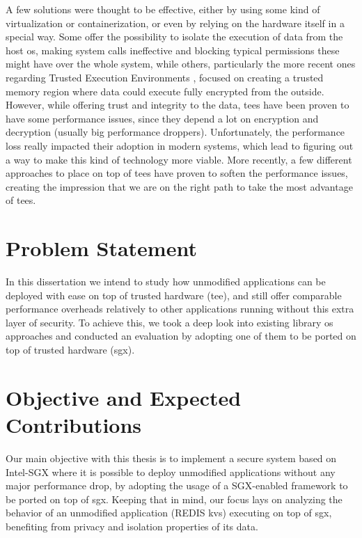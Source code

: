 A few solutions were thought to be effective, either by using some kind of virtualization or containerization, or even by relying on the hardware itself in a special way. 
Some \cite{virtGhostPaper}\cite{flickerPaper}\cite{mushiPaper}\cite{SeCagePaper}\cite{inkTagPaper}\cite{segoPaper} offer the possibility to isolate the execution of data from the host \gls{os}, making system calls ineffective and blocking typical permissions these might have over the whole system, while others, particularly the more recent ones regarding Trusted Execution Environments \cite{armTZPaper}\cite{amdPaper}\cite{sanctumPaper}\cite{intelSGX}, focused on creating a trusted memory region where data could execute fully encrypted from the outside. 
However, while offering trust and integrity to the data, \gls{tee}s have been proven to have some performance issues, since they depend a lot on encryption and decryption (usually big performance droppers). Unfortunately, the performance loss really impacted their adoption in modern systems, which lead to figuring out a way to make this kind of technology more viable. 
More recently, a few different approaches to place on top of \gls{tee}s have proven to soften the performance issues, creating the impression that we are on the right path to take the most advantage of \gls{tee}s. 


\section{Problem Statement}

In this dissertation we intend to study how unmodified applications can be deployed with ease on top of trusted hardware (\gls{tee}), and still offer comparable performance overheads relatively to other applications running without this extra layer of security. To achieve this, we took a deep look into existing library \gls{os} approaches and conducted an evaluation by adopting one of them to be ported on top of trusted hardware (\gls{sgx}). 




\section{Objective and Expected Contributions} %
\label{sec:objectiveAndContibutions}
Our main objective with this thesis is to implement a secure system based on Intel-SGX
where it is possible to deploy unmodified applications without any major performance
drop, by adopting the usage of a SGX-enabled framework to be ported on top of \gls{sgx}. Keeping that in mind, our focus lays on analyzing the behavior of an unmodified application (REDIS \gls{kvs}) executing on top of \gls{sgx}, benefiting from privacy and isolation properties of its data.

